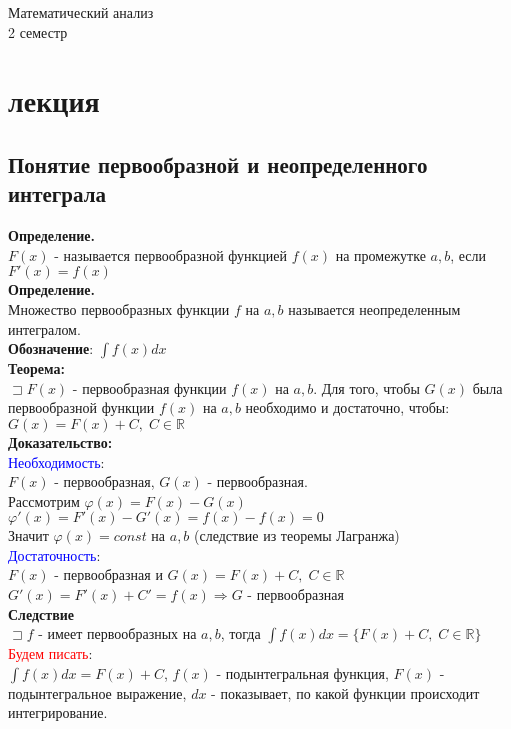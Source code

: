 \documentclass[14pt]{article}
\begin{document}
	\begin{center}
		\Huge Математический анализ \\
		\large 2 семестр 
	\end{center}
	\normalsize 
	\section{лекция}
	\subsection{Понятие первообразной и неопределенного интеграла}
	\textbf{Определение.} \\
	$F(x)$ - называется первообразной функцией $f(x)$ на промежутке $a,b$, если $F'(x)=f(x)$ \\
	\textbf{Определение.} \\
	Множество первообразных функции $f$ на $a,b$ называется неопределенным интегралом. \\
	\textbf{Обозначение}:\; $\int f(x) dx$ \\
	\textbf{Теорема:} \\
	$\sqsupset F(x)$ - первообразная функции $f(x)$ на $a,b$. Для того, чтобы $G(x)$ была первообразной функции $f(x)$ на $a,b$ необходимо и достаточно, чтобы: $G(x)=F(x)+C, \; C\in \mathbb{R}$ \\
	\textbf{Доказательство:} \\
	\textcolor{blue}{Необходимость}: \\
	$F(x)$ - первообразная, $G(x)$ - первообразная. \\
	Рассмотрим $\varphi(x)=F(x)-G(x)$ \\
	$\varphi'(x)=F'(x)-G'(x) = f(x)-f(x)=0$ \\
	Значит $\varphi(x)=const$ на $a,b$ (следствие из теоремы Лагранжа) \\
	\textcolor{blue}{Достаточность}: \\
	$F(x)$ - первообразная и $G(x)=F(x)+C, \; C \in \mathbb{R}$ \\
	$G'(x)=F'(x)+C'=f(x) \Rightarrow G$ - первообразная \\
	\textbf{Следствие} \\
	$\sqsupset f$ - имеет первообразных на $a,b$, тогда $\int f(x)dx = \{F(x)+C,\; C \in \mathbb{R} \}$ \\
	\textcolor{red}{Будем писать}: \\
	$\int f(x)dx=F(x)+C$, $f(x)$ - подынтегральная функция, $F(x)$ - подынтегральное выражение, $dx$ - показывает, по какой функции происходит интегрирование. \\
\end{document}

